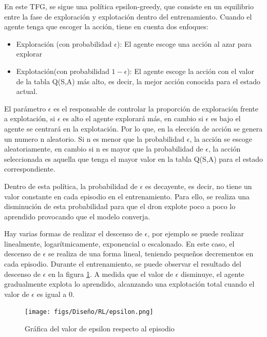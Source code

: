 \begin{itemize}
    En este TFG, se sigue una política epsilon-greedy\cite{Epsilon-greedy}, que consiste en un equilibrio entre la fase de exploración y explotación dentro 
    del entrenamiento. Cuando el agente tenga que escoger la acción, tiene en cuenta dos enfoques:
 
 \begin{itemize}
   \item Exploración (con probabilidad $\epsilon$): El agente escoge una acción al azar para explorar
   \item Explotación(con probabilidad $ 1 - \epsilon$): El agente escoge la acción con el valor de la tabla Q(S,A) más alto, es decir, la mejor acción conocida para el estado actual.
 \end{itemize}
 
 El parámetro $\epsilon$ es el responsable de controlar la proporción de exploración frente a explotación, si $\epsilon$ es alto el agente explorará más, en cambio si $\epsilon$ es bajo
 el agente se centrará en la explotación. Por lo que, en la elección de acción se genera un numero n aleatorio. Si n es menor que la probabilidad $\epsilon$, la acción se escoge aleatoriamente, 
 en cambio si n es mayor que la probabilidad de $\epsilon$, la acción seleccionada es aquella que tenga el mayor valor en la tabla Q(S,A) para el estado correspondiente. \newline
 
 Dentro de esta política, la probabilidad de $\epsilon$ es decayente, es decir, no tiene un valor constante en cada episodio en el entrenamiento. Para ello, se realiza una disminución 
 de esta probabilidad para que el dron explote poco a poco lo aprendido provocando que el modelo converja. 
 
 Hay varias formas de realizar el descenso
 de $\epsilon$, por ejemplo se puede realizar linealmente, logarítmicamente, exponencial o escalonado. En este caso, el descenso de $\epsilon$ se realiza 
 de una forma lineal, teniendo pequeños decrementos en cada episodio. Durante el entrenamiento, se puede observar el resultado del descenso de $\epsilon$ en la figura \ref{fig:epsilon}. A medida
 que el valor de $\epsilon$ disminuye, el agente gradualmente explota lo aprendido, alcanzando una explotación total cuando el valor de $\epsilon$ es igual a 0.
 
 \begin{figure} [H]
  \begin{center}
    \texttt{[image: figs/Diseño/RL/epsilon.png]}
  \end{center}
  \caption{Gráfica del valor de epsilon respecto al episodio}
  \label{fig:epsilon}
\end{figure}
  \end{itemize}

